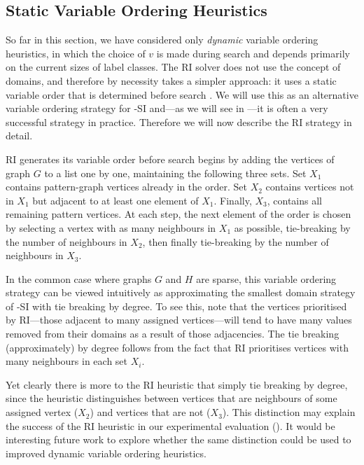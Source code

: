 \subsection{Static Variable Ordering Heuristics}\label{subsec:mcsplit-si-static}

So far in this section, we have considered only \emph{dynamic} variable
ordering heuristics, in which the choice of $v$ is made during search and
depends primarily on the current sizes of label classes.  The RI solver does
not use the concept of domains, and therefore by necessity takes a simpler
approach: it uses a static variable order that is determined before search
\citep{DBLP:journals/tcbb/BonniciG17}.  We will use this as an alternative
variable ordering strategy for \McSplit-SI and---as we will see in
---it is often a very successful strategy in practice.
Therefore we will now describe the RI strategy in detail.

RI generates its variable order before search begins by adding the vertices
of graph $G$ to a list one by one,
maintaining the following three sets.  Set $X_1$ contains pattern-graph vertices already in
the order. Set $X_2$ contains vertices not in $X_1$ but adjacent to at least
one element of $X_1$.  Finally, $X_3$, contains all remaining pattern vertices.
At each step, the next element of the order is chosen by selecting a vertex
with as many neighbours in $X_1$ as possible, tie-breaking by the number of
neighbours in $X_2$, then finally tie-breaking by the number of neighbours in
$X_3$.

In the common case where graphs $G$ and $H$ are sparse, this variable
ordering strategy can be viewed intuitively as approximating the smallest
domain strategy of \McSplit-SI with tie breaking by degree.  To see this, note
that the vertices prioritised by RI---those adjacent to many assigned
vertices---will tend to have many values removed from their domains as a result
of those adjacencies.  The tie breaking (approximately) by degree follows from
the fact that RI prioritises vertices with many neighbours in each set $X_i$.

Yet clearly there is more to the RI heuristic that simply tie breaking by
degree, since the heuristic distinguishes between vertices that are neighbours
of some assigned vertex ($X_2$) and vertices that are not ($X_3$). This
distinction may explain the success of the RI heuristic in our experimental
evaluation ().  It would be interesting future work to
explore whether the same distinction could be used to improved dynamic variable
ordering heuristics.

